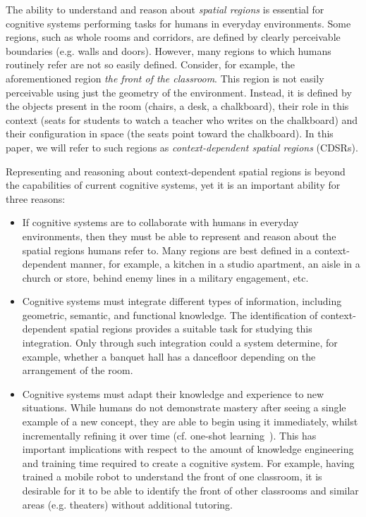 \documentclass[letterpaper]{article}
\begin{document}
The ability to understand and reason about \textit{spatial regions} is essential for cognitive systems performing tasks for humans in everyday environments. Some regions, such as whole rooms and corridors, are defined by clearly perceivable boundaries (e.g. walls and doors). However, many regions to which humans routinely refer are not so easily defined. Consider, for example, the aforementioned region \textit{the front of the classroom}. This region is not easily perceivable using just the geometry of the environment. Instead, it is defined by the objects present in the room (chairs, a desk, a chalkboard), their role in this context (seats for students to watch a teacher who writes on the chalkboard) and their configuration in space (the seats point toward the chalkboard). In this paper, we will refer to such regions as \textit{context-dependent spatial regions} (CDSRs). 


Representing and reasoning about context-dependent spatial regions is beyond the capabilities of current cognitive systems, yet it is an important ability for three reasons:

\begin{itemize}

\item{If cognitive systems are to collaborate with humans in everyday environments, then they must be able to represent and reason about the spatial regions humans refer to. Many regions are best defined in a context-dependent manner, for example, a kitchen in a studio apartment, an aisle in a church or store, behind enemy lines in a military engagement, etc.}


\item{Cognitive systems must integrate different types of information, including geometric, semantic, and functional knowledge. The identification of context-dependent spatial regions provides a suitable task for studying this integration. Only through such integration could a system determine, for example, whether a banquet hall has a dancefloor depending on the arrangement of the room.}

\item{Cognitive systems must adapt their knowledge and experience to new situations. While humans do not demonstrate mastery after seeing a single example of a new concept, they are able to begin using it immediately, whilst incrementally refining it over time (cf. one-shot learning~\cite{Fei-Fei/etal:2006}). This has important implications with respect to the amount of knowledge engineering and training time required to create a cognitive system. For example, having trained a mobile robot to understand the front of one classroom, it is desirable for it to be able to identify the front of other classrooms and similar areas (e.g. theaters) without additional tutoring.}
\end{itemize}
\end{document}
